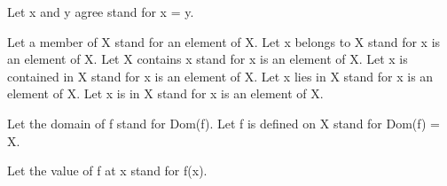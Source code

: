


\begin{forthel}

  Let x and y agree stand for x = y.


  Let a member of X stand for an element of X.
  Let x belongs to X stand for x is an element of X.
  Let X contains x stand for x is an element of X.
  Let x is contained in X stand for x is an element of X.
  Let x lies in X stand for x is an element of X.
  Let x is in X stand for x is an element of X.


  Let the domain of f stand for Dom(f).
  Let f is defined on X stand for Dom(f) = X.


  Let the value of f at x stand for f(x).
\end{forthel}
